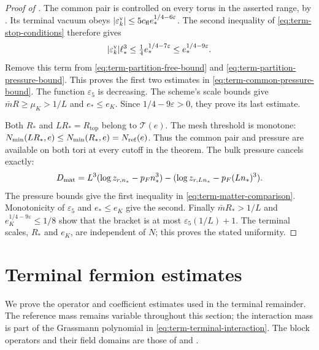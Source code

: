 \documentclass[11pt,letterpaper,reqno]{amsart}
\begin{document}
\begin{proof}[Proof of ]
The common pair is controlled on every torus in the
asserted range, by \cite[Theorem~D]{CoverTuning}.
Its terminal vacuum obeys
$|\varepsilon_k^{\rm v}|
\le5c_{\rm fl}e_*^{1/4-6\varepsilon}$.
The second inequality of \eqref{eq:term-stop-conditions}
therefore gives
\[
 |\varepsilon_k^{\rm v}|\ell_*^3
          \le\tfrac14e_*^{1/4-7\varepsilon}
          \le e_*^{1/4-9\varepsilon}.
\]
Remove this term from
\eqref{eq:term-partition-free-bound} and
\eqref{eq:term-partition-pressure-bound}. This proves
the first two estimates in
\eqref{eq:term-common-pressure-bound}.
The function $\varepsilon_5$ is decreasing.
The scheme's scale bounds give
$\bar mR\ge\mu_K>1/L$ and $e_*\le e_K$.
Since $1/4-9\varepsilon>0$, they prove its last estimate.

Both $R_*$ and $LR_*=R_{\mathrm{top}}$ belong to
$\mathcal T(e)$. The mesh threshold is monotone:
$N_{\min}(LR_*,e)\le N_{\min}(R_*,e)=N_{\rm ref}(e)$.
Thus the common pair and pressure are available on
both tori at every cutoff in the theorem.
The bulk pressure cancels exactly:
\[
 D_{\rm mat}=
 L^3(\log z_{r,n_*}-p_Fn_*^3)
             -(\log z_{r,Ln_*}-p_F(Ln_*)^3).
\]
The pressure bounds give the first inequality in
\eqref{eq:term-matter-comparison}.
Monotonicity of $\varepsilon_5$ and $e_*\le e_K$
give the second. Finally
$\bar mR_*>1/L$ and
$e_K^{1/4-9\varepsilon}\le1/8$ show that the bracket
is at most $\varepsilon_5(1/L)+1$.
The terminal scales, $R_*$ and $e_K$, are independent
of $N$; this proves the stated uniformity.
\end{proof}


\section{Terminal fermion estimates}
\label{subsec:interacting-terminal-operators}

We prove the operator and coefficient estimates used in
the terminal remainder. The reference mass remains variable
throughout this section; the interaction mass is part of the
Grassmann polynomial in \eqref{eq:term-terminal-interaction}.
The block operators and their field domains are those of
\cite[Theorem~A and \S4.2]{FermionBlock} and \cite[\S6]{MaxwellBlock}.
\end{document}
